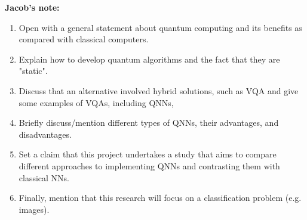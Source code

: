 \vspace{60pt}
\textbf {Jacob's note:}
\begin{enumerate}
    \item Open with a general statement about quantum computing and its benefits as compared with classical computers.
    \item Explain how to develop quantum algorithms and the fact that they are "static".
    \item Discuss that an alternative involved hybrid solutions, such as VQA and give some examples of VQAs, including QNNs, 
    \item Briefly discuss/mention different types of QNNs, their advantages, and disadvantages.
    \item Set a claim that this project undertakes a study that aims to compare different approaches to implementing QNNs and contrasting them with classical NNs.
    \item Finally, mention that this research will focus on a classification problem (e.g. images).
\end{enumerate}